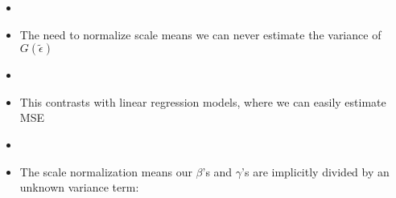 \documentclass[aspectratio=169]{beamer}
\begin{document}
\begin{frame}

\begin{itemize}
\item[]
\item The need to normalize scale means we can never estimate the variance of $G(\tilde{\epsilon})$
\item[]
\item This contrasts with linear regression models, where we can easily estimate MSE
\item[]
\item<2-> The scale normalization means our $\beta$'s and $\gamma$'s are implicitly divided by an unknown variance term:
\end{itemize}
\vspace{-0.4cm}

\end{frame}
\end{document}
